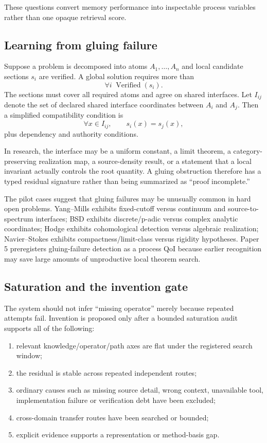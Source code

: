 These questions convert memory performance into inspectable process variables rather than one opaque retrieval score.

\subsection{Learning from gluing failure}

Suppose a problem is decomposed into atoms $A_1,\ldots,A_n$ and local candidate sections $s_i$ are verified. A global solution requires more than
\[
\forall i\;\operatorname{Verified}(s_i).
\]
The sections must cover all required atoms and agree on shared interfaces. Let $I_{ij}$ denote the set of declared shared interface coordinates between $A_i$ and $A_j$. Then a simplified compatibility condition is
\[
\forall x\in I_{ij},\qquad s_i(x)=s_j(x),
\]
plus dependency and authority conditions.

In research, the interface may be a uniform constant, a limit theorem, a category-preserving realization map, a source-density result, or a statement that a local invariant actually controls the root quantity. A gluing obstruction therefore has a typed residual signature rather than being summarized as ``proof incomplete.''

The pilot cases suggest that gluing failures may be unusually common in hard open problems. Yang--Mills exhibits fixed-cutoff versus continuum and source-to-spectrum interfaces; BSD exhibits discrete/p-adic versus complex analytic coordinates; Hodge exhibits cohomological detection versus algebraic realization; Navier--Stokes exhibits compactness/limit-class versus rigidity hypotheses. Paper 5 preregisters gluing-failure detection as a process QoI because earlier recognition may save large amounts of unproductive local theorem search.

\subsection{Saturation and the invention gate}

The system should not infer ``missing operator'' merely because repeated attempts fail. Invention is proposed only after a bounded saturation audit supports all of the following:

\begin{enumerate}[leftmargin=*]
\item relevant knowledge/operator/path axes are flat under the registered search window;
\item the residual is stable across repeated independent routes;
\item ordinary causes such as missing source detail, wrong context, unavailable tool, implementation failure or verification debt have been excluded;
\item cross-domain transfer routes have been searched or bounded;
\item explicit evidence supports a representation or method-basis gap.
\end{enumerate}

